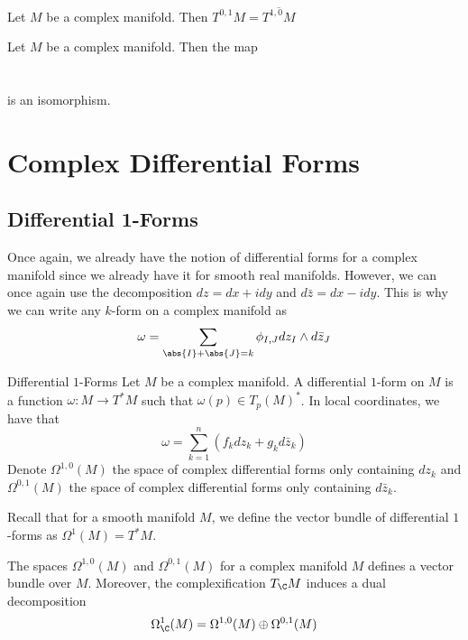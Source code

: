 \documentclass[a4paper]{article}
\begin{document}
\begin{prp}{}{} Let $M$ be a complex manifold. Then $T^{0,1}M=\overline{T^{1,0}M}$
\end{prp}

\begin{lmm}{}{} Let $M$ be a complex manifold. Then the map \\~\\
 \\
is an isomorphism. 
\end{lmm}

\pagebreak
\section{Complex Differential Forms}
\subsection{Differential 1-Forms}
Once again, we already have the notion of differential forms for a complex manifold since we already have it for smooth real manifolds. However, we can once again use the decomposition $dz=dx+idy$ and $d\bar{z}=dx-idy$. This is why we can write any $k$-form on a complex manifold as $$\omega=\sum_{\abs{I}+\abs{J}=k}\phi_{I,J}dz_I\wedge d\bar{z}_J$$

\begin{defn}{Differential $1$-Forms}{} Let $M$ be a complex manifold. A differential $1$-form on $M$ is a function $\omega:M\to T^\ast M$ such that $\omega(p)\in T_p(M)^\ast$. In local coordinates, we have that $$\omega=\sum_{k=1}^n(f_kdz_k+g_kd\bar{z}_k)$$
Denote $\Omega^{1,0}(M)$ the space of complex differential forms only containing $dz_k$ and $\Omega^{0,1}(M)$ the space of complex differential forms only containing $d\bar{z}_k$. 
\end{defn}

Recall that for a smooth manifold $M$, we define the vector bundle of differential $1$-forms as $\Omega^1(M)=T^\ast M$. 

\begin{prp}{}{} The spaces $\Omega^{1,0}(M)$ and $\Omega^{0,1}(M)$ for a complex manifold $M$ defines a vector bundle over $M$. Moreover, the complexification $T_{\C}M$ induces a dual decomposition $$\Omega_{\C}^1(M)=\Omega^{1,0}(M)\oplus\Omega^{0,1}(M)$$
\end{prp}
\end{document}
